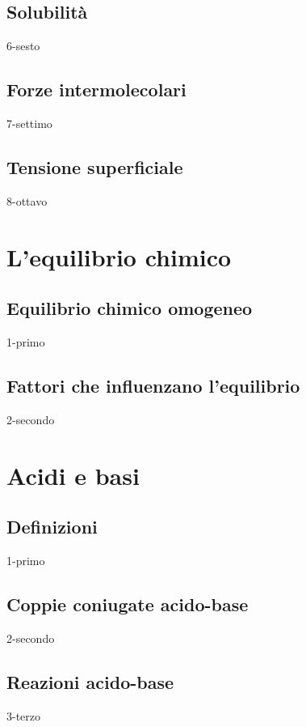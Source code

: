 \documentclass[openany,12pt]{book}%
\begin{document}
{\section{Solubilità}
{6-sesto}

\section{Forze intermolecolari}
{7-settimo}

\section{Tensione superficiale}
{8-ottavo}

\chapter{L'equilibrio chimico}

\section{Equilibrio chimico omogeneo}
{1-primo}

\section{Fattori che influenzano l'equilibrio}
{2-secondo}
}%
\chapter{Acidi e basi}

\section{Definizioni}
{1-primo}

\section{Coppie coniugate acido-base}
{2-secondo}

\section{Reazioni acido-base}
{3-terzo}
\end{document}
